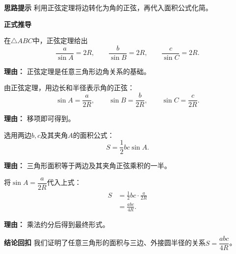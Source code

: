 \begin{proofbox}
	\textbf{\textcolor{CProof}{思路提示}}
	利用正弦定理将边转化为角的正弦，再代入面积公式化简。

	\medskip
	\textbf{\textcolor{CProof}{正式推导}}
	\begin{description}[style=nextline, leftmargin=2.8em, labelsep=0.5em, itemsep=0.55em]
		\item[\textbf{步骤一（正弦定理）：}] 在$\triangle ABC$中，正弦定理给出
			\[
				\frac{a}{\sin A} = 2R,
				\qquad
				\frac{b}{\sin B} = 2R,
				\qquad
				\frac{c}{\sin C} = 2R.
			\]
			\par\textbf{理由：} 正弦定理是任意三角形边角关系的基础。

		\item[\textbf{步骤二（变量替换）：}] 由正弦定理，用边长和半径表示角的正弦：
			\[
				\sin A = \frac{a}{2R},
				\qquad
				\sin B = \frac{b}{2R},
				\qquad
				\sin C = \frac{c}{2R}.
			\]
			\par\textbf{理由：} 移项即可得到。

		\item[\textbf{步骤三（面积公式）：}] 选用两边$b,c$及其夹角$A$的面积公式：
			\[
				S = \frac12 bc\sin A.
			\]
			\par\textbf{理由：} 三角形面积等于两边及其夹角正弦乘积的一半。

		\item[\textbf{步骤四（代换化简）：}] 将$\sin A = \dfrac{a}{2R}$代入上式：
			\[
				\begin{aligned}
					S &= \frac12 bc \cdot \frac{a}{2R} \\
					&= \frac{abc}{4R}.
			\end{aligned}
			\]
			\par\textbf{理由：} 乘法约分后得到最终形式。
	\end{description}
	\medskip
	\textbf{\textcolor{CProof}{结论回扣}}
	我们证明了任意三角形的面积与三边、外接圆半径的关系$S = \dfrac{abc}{4R}$。
\end{proofbox}
